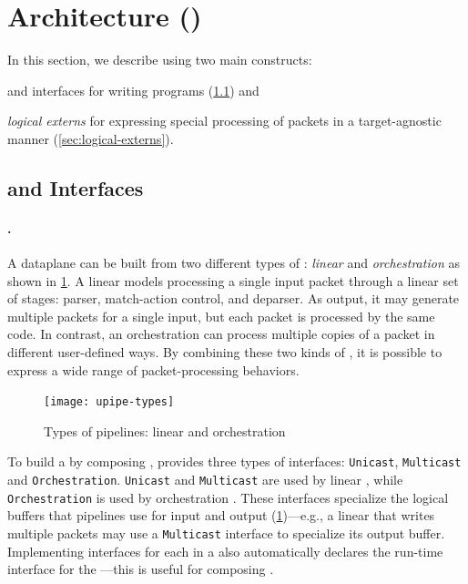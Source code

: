 \documentclass[letterpaper,twocolumn,10pt]{article}
\begin{document}
\section{\uswitch Architecture (\uarch)}
\label{sec:architecture}
In this section, we describe \uarch using two main constructs:
\begin{enumerate*}[label=(\roman*)]
  \item \emph{\upipelines} and interfaces for writing \ulang programs
    (\cref{sec:pipelines}) and
  \item \emph{logical externs} for expressing special processing of
    packets in a target-agnostic manner (\cref{sec:logical-externs}).
\end{enumerate*}


\subsection{\upipelines and Interfaces}
\label{sec:pipelines}

\paragraph*{\upipeline.}%
%
A \ulang dataplane can be built from two different types of
\upipelines: \emph{linear} and \emph{orchestration} as shown in
\cref{fig:pipe-types}. A linear \upipeline models processing a single
input packet through a linear set of stages: parser, match-action
control, and deparser. As output, it may generate multiple packets for
a single input, but each packet is processed by the same code. In
contrast, an orchestration \upipeline can process multiple copies of a
packet in different user-defined ways. By combining these two kinds of
\upipelines, it is possible to express a wide range of
packet-processing behaviors.

\begin{figure}[!tbp]
  \centering
  \texttt{[image: upipe-types]}
  \caption{Types of \uarch pipelines: linear and orchestration}
  \label{fig:pipe-types}
\end{figure}

%
To build a \uprogram by composing \upipelines, \uarch provides three
types of interfaces: \texttt{Unicast}, \texttt{Multicast} and
\texttt{Orchestration}.  \texttt{Unicast} and \texttt{Multicast} are
used by linear \upipelines, while \texttt{Orchestration} is used by
orchestration \upipelines. These interfaces specialize the logical
buffers that pipelines use for input and output
(\cref{fig:pipe-types})---e.g., a linear \upipeline that writes
multiple packets may use a \texttt{Multicast} interface to specialize
its output buffer. Implementing interfaces for each \upipeline in a
\uprogram also automatically declares the run-time interface for the
\uprogram---this is useful for composing \uprograms.
\end{document}
